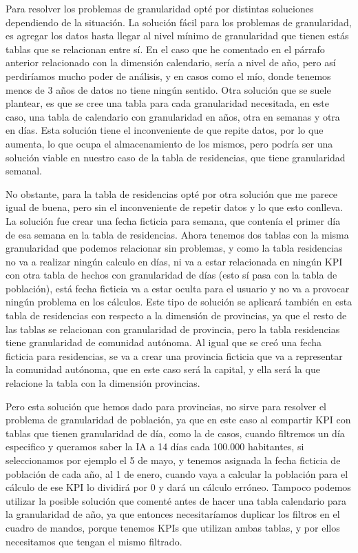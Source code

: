 Para resolver los problemas de granularidad opté por distintas soluciones dependiendo de la situación. La solución fácil para los problemas de granularidad, es agregar los datos hasta llegar al nivel mínimo de granularidad que tienen estás tablas que se relacionan entre sí. En el caso que he comentado en el párrafo anterior relacionado con la dimensión calendario, sería a nivel de año, pero así perdiríamos mucho poder de análisis, y en casos como el mío, donde tenemos menos de 3 años de datos no tiene ningún sentido. Otra solución que se suele plantear, es que se cree una tabla para cada granularidad necesitada, en este caso, una tabla de calendario con granularidad en años, otra en semanas y otra en días. Esta solución tiene el inconveniente de que repite datos, por lo que aumenta, lo que ocupa el almacenamiento de los mismos, pero podría ser una solución viable en nuestro caso de la tabla de residencias, que tiene granularidad semanal.

No obstante, para la tabla de residencias opté por otra solución que me parece igual de buena, pero sin el inconveniente de repetir datos y lo que esto conlleva. La solución fue crear una fecha ficticia para semana, que contenía el primer día de esa semana en la tabla de residencias. Ahora tenemos dos tablas con la misma granularidad que podemos relacionar sin problemas, y como la tabla residencias no va a realizar ningún calculo en días, ni va a estar relacionada en ningún KPI con otra tabla de hechos con granularidad de días (esto sí pasa con la tabla de población), está fecha ficticia va a estar oculta para el usuario y no va a provocar ningún problema en los cálculos. Este tipo de solución se aplicará también en esta tabla de residencias con respecto a la dimensión de provincias, ya que el resto de las tablas se relacionan con granularidad de provincia, pero la tabla residencias tiene granularidad de comunidad autónoma. Al igual que se creó una fecha ficticia para residencias, se va a crear una provincia ficticia que va a representar la comunidad autónoma, que en este caso será la capital, y ella será la que relacione la tabla con la dimensión provincias.

Pero esta solución que hemos dado para provincias, no sirve para resolver el problema de granularidad de población, ya que en este caso al compartir KPI con tablas que tienen granularidad de día, como la de casos, cuando filtremos un día especifico y queramos saber la IA a 14 días cada 100.000 habitantes, si seleccionamos por ejemplo el 5 de mayo, y tenemos asignada la fecha ficticia de población de cada año, al 1 de enero, cuando vaya a calcular la población para el cálculo de ese KPI lo dividirá por 0 y dará un cálculo erróneo. Tampoco podemos utilizar la posible solución que comenté antes de hacer una tabla calendario para la granularidad de año, ya que entonces necesitaríamos duplicar los filtros en el cuadro de mandos, porque tenemos KPIs que utilizan ambas tablas, y por ellos necesitamos que tengan el mismo filtrado. 

